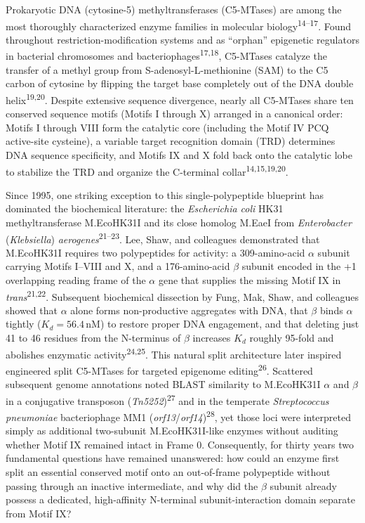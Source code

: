 \documentclass[10pt,letterpaper]{article}
\newcommand{\spname}[1]{\textit{#1}}
\newcommand{\gene}[1]{\textit{#1}}
\newcommand{\refsup}[1]{\textsuperscript{#1}}
\begin{document}
Prokaryotic DNA (cytosine-5) methyltransferases (C5-MTases) are among the most thoroughly characterized enzyme families in molecular biology\refsup{14--17}. Found throughout restriction-modification systems and as ``orphan'' epigenetic regulators in bacterial chromosomes and bacteriophages\refsup{17,18}, C5-MTases catalyze the transfer of a methyl group from S-adenosyl-L-methionine (SAM) to the C5 carbon of cytosine by flipping the target base completely out of the DNA double helix\refsup{19,20}. Despite extensive sequence divergence, nearly all C5-MTases share ten conserved sequence motifs (Motifs I through X) arranged in a canonical order: Motifs I through VIII form the catalytic core (including the Motif IV PCQ active-site cysteine), a variable target recognition domain (TRD) determines DNA sequence specificity, and Motifs IX and X fold back onto the catalytic lobe to stabilize the TRD and organize the C-terminal collar\refsup{14,15,19,20}.

Since 1995, one striking exception to this single-polypeptide blueprint has dominated the biochemical literature: the \spname{Escherichia coli} HK31 methyltransferase M.EcoHK31I and its close homolog M.EaeI from \spname{Enterobacter} (\spname{Klebsiella}) \spname{aerogenes}\refsup{21--23}. Lee, Shaw, and colleagues demonstrated that M.EcoHK31I requires two polypeptides for activity: a 309-amino-acid $\alpha$ subunit carrying Motifs I--VIII and X, and a 176-amino-acid $\beta$ subunit encoded in the +1 overlapping reading frame of the $\alpha$ gene that supplies the missing Motif IX in \textit{trans}\refsup{21,22}. Subsequent biochemical dissection by Fung, Mak, Shaw, and colleagues showed that $\alpha$ alone forms non-productive aggregates with DNA, that $\beta$ binds $\alpha$ tightly ($K_d = 56.4$\,nM) to restore proper DNA engagement, and that deleting just 41 to 46 residues from the N-terminus of $\beta$ increases $K_d$ roughly 95-fold and abolishes enzymatic activity\refsup{24,25}. This natural split architecture later inspired engineered split C5-MTases for targeted epigenome editing\refsup{26}. Scattered subsequent genome annotations noted BLAST similarity to M.EcoHK31I $\alpha$ and $\beta$ in a conjugative transposon (\gene{Tn5252})\refsup{27} and in the temperate \spname{Streptococcus pneumoniae} bacteriophage MM1 (\gene{orf13}/\gene{orf14})\refsup{28}, yet those loci were interpreted simply as additional two-subunit M.EcoHK31I-like enzymes without auditing whether Motif IX remained intact in Frame 0. Consequently, for thirty years two fundamental questions have remained unanswered: how could an enzyme first split an essential conserved motif onto an out-of-frame polypeptide without passing through an inactive intermediate, and why did the $\beta$ subunit already possess a dedicated, high-affinity N-terminal subunit-interaction domain separate from Motif IX?
\end{document}
